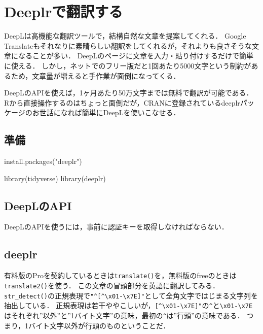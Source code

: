 \documentclass[
]{article}
\newenvironment{Shaded}{\begin{snugshade}}{\end{snugshade}}
\newcommand{\FunctionTok}[1]{\textcolor[rgb]{0.00,0.00,0.00}{#1}}
\newcommand{\NormalTok}[1]{#1}
\newcommand{\StringTok}[1]{\textcolor[rgb]{0.31,0.60,0.02}{#1}}
\begin{document}
\hypertarget{deeplr}{%
\section{Deeplrで翻訳する}\label{deeplr}}

DeepLは高機能な翻訳ツールで，結構自然な文章を提案してくれる．
Google Translateもそれなりに素晴らしい翻訳をしてくれるが，それよりも良さそうな文章になることが多い．
DeepLのページに文章を入力・貼り付けするだけで簡単に使える．
しかし，ネットでのフリー版だと1回あたり5000文字という制約があるため，文章量が増えると手作業が面倒になってくる．

DeepLのAPIを使えば，1ヶ月あたり50万文字までは無料で翻訳が可能である．
Rから直接操作するのはちょっと面倒だが，CRANに登録されているdeeplrパッケージのお世話になれば簡単にDeepLを使いこなせる．

\hypertarget{ux6e96ux5099-5}{%
\subsection{準備}\label{ux6e96ux5099-5}}

\begin{Shaded}
\begin{Highlighting}[]
\FunctionTok{install.packages}\NormalTok{(}\StringTok{"deeplr"}\NormalTok{)}
\end{Highlighting}
\end{Shaded}

\begin{Shaded}
\begin{Highlighting}[]
\FunctionTok{library}\NormalTok{(tidyverse)}
\FunctionTok{library}\NormalTok{(deeplr)}
\end{Highlighting}
\end{Shaded}

\hypertarget{deeplux306eapi}{%
\subsection{DeepLのAPI}\label{deeplux306eapi}}

DeepLのAPIを使うには，事前に認証キーを取得しなければならない．

\hypertarget{deeplr-1}{%
\subsection{deeplr}\label{deeplr-1}}

有料版のProを契約しているときは\texttt{translate()}を，無料版のfreeのときは\texttt{translate2()}を使う．
この文章の冒頭部分を英語に翻訳してみる．
\texttt{str\_detect()}の正規表現で\texttt{"\^{}{[}\^{}\textbackslash{}x01-\textbackslash{}x7E{]}"}として全角文字ではじまる文字列を抽出している．
正規表現は若干ややこしいが，\texttt{{[}\^{}\textbackslash{}x01-\textbackslash{}x7E{]}"}の\texttt{\^{}}と\texttt{\textbackslash{}x01-\textbackslash{}x7E}はそれぞれ''以外''と''1バイト文字''の意味，最初の\texttt{\^{}}は''行頭''の意味である．
つまり，1バイト文字以外が行頭のものということだ．
\end{document}
